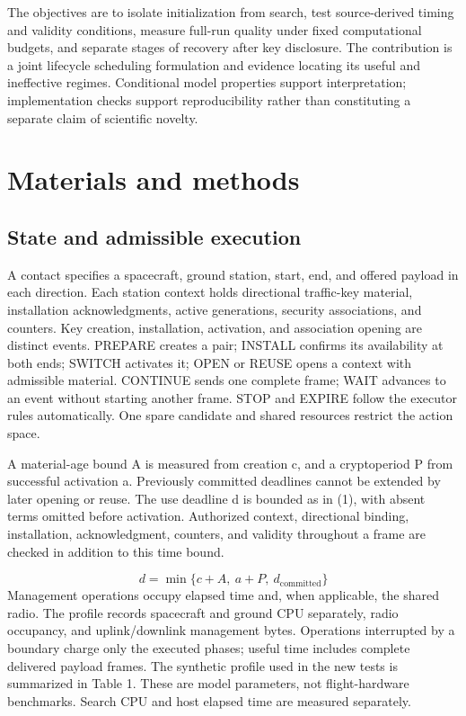 \documentclass[12pt,a4paper]{article}
\begin{document}
The objectives are to isolate initialization from search, test source-derived timing and validity conditions, measure full-run quality under fixed computational budgets, and separate stages of recovery after key disclosure. The contribution is a joint lifecycle scheduling formulation and evidence locating its useful and ineffective regimes. Conditional model properties support interpretation; implementation checks support reproducibility rather than constituting a separate claim of scientific novelty.

\section*{Materials and methods}
\subsection*{State and admissible execution}
A contact specifies a spacecraft, ground station, start, end, and offered payload in each direction. Each station context holds directional traffic-key material, installation acknowledgments, active generations, security associations, and counters. Key creation, installation, activation, and association opening are distinct events. PREPARE creates a pair; INSTALL confirms its availability at both ends; SWITCH activates it; OPEN or REUSE opens a context with admissible material. CONTINUE sends one complete frame; WAIT advances to an event without starting another frame. STOP and EXPIRE follow the executor rules automatically. One spare candidate and shared resources restrict the action space.

A material-age bound A is measured from creation c, and a cryptoperiod P from successful activation a. Previously committed deadlines cannot be extended by later opening or reuse. The use deadline d is bounded as in (1), with absent terms omitted before activation. Authorized context, directional binding, installation, acknowledgment, counters, and validity throughout a frame are checked in addition to this time bound.

\begin{equation}d=\min\{c+A,\ a+P,\ d_{\mathrm{committed}}\}\tag{1}\end{equation}
Management operations occupy elapsed time and, when applicable, the shared radio. The profile records spacecraft and ground CPU separately, radio occupancy, and uplink/downlink management bytes. Operations interrupted by a boundary charge only the executed phases; useful time includes complete delivered payload frames. The synthetic profile used in the new tests is summarized in Table 1. These are model parameters, not flight-hardware benchmarks. Search CPU and host elapsed time are measured separately.
\end{document}
